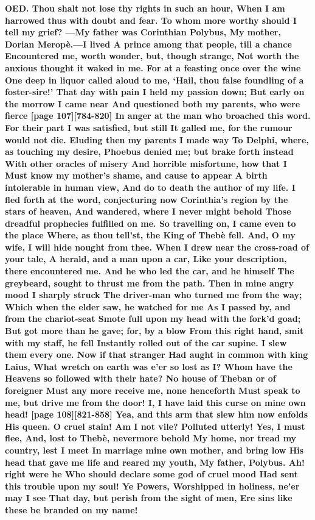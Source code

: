\documentclass[11pt,letter]{book}
\begin{document}
\par \textbf{OED. Thou shalt not lose thy rights in such an hour, When I am harrowed thus with doubt and fear. To whom more worthy should I tell my grief? —My father was Corinthian Polybus, My mother, Dorian Meropè.—I lived A prince among that people, till a chance Encountered me, worth wonder, but, though strange, Not worth the anxious thought it waked in me. For at a feasting once over the wine One deep in liquor called aloud to me, ‘Hail, thou false foundling of a foster-sire!’ That day with pain I held my passion down; But early on the morrow I came near And questioned both my parents, who were fierce [page 107][784-820] In anger at the man who broached this word. For their part I was satisfied, but still It galled me, for the rumour would not die. Eluding then my parents I made way To Delphi, where, as touching my desire, Phoebus denied me; but brake forth instead With other oracles of misery And horrible misfortune, how that I Must know my mother’s shame, and cause to appear A birth intolerable in human view, And do to death the author of my life. I fled forth at the word, conjecturing now Corinthia’s region by the stars of heaven, And wandered, where I never might behold Those dreadful prophecies fulfilled on me. So travelling on, I came even to the place Where, as thou tell’st, the King of Thebè fell. And, O my wife, I will hide nought from thee. When I drew near the cross-road of your tale, A herald, and a man upon a car, Like your description, there encountered me. And he who led the car, and he himself The greybeard, sought to thrust me from the path. Then in mine angry mood I sharply struck The driver-man who turned me from the way; Which when the elder saw, he watched for me As I passed by, and from the chariot-seat Smote full upon my head with the fork’d goad; But got more than he gave; for, by a blow From this right hand, smit with my staff, he fell Instantly rolled out of the car supine. I slew them every one. Now if that stranger Had aught in common with king Laius, What wretch on earth was e’er so lost as I? Whom have the Heavens so followed with their hate? No house of Theban or of foreigner Must any more receive me, none henceforth Must speak to me, but drive me from the door! I, I have laid this curse on mine own head! [page 108][821-858] Yea, and this arm that slew him now enfolds His queen. O cruel stain! Am I not vile? Polluted utterly! Yes, I must flee, And, lost to Thebè, nevermore behold My home, nor tread my country, lest I meet In marriage mine own mother, and bring low His head that gave me life and reared my youth, My father, Polybus. Ah! right were he Who should declare some god of cruel mood Had sent this trouble upon my soul! Ye Powers, Worshipped in holiness, ne’er may I see That day, but perish from the sight of men, Ere sins like these be branded on my name!}
\par 
\end{document}
